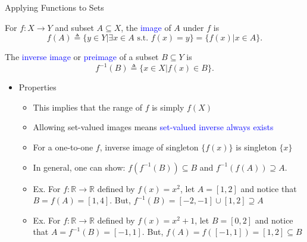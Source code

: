 \documentclass[10pt,english]{beamer}
\begin{document}
\begin{frame}{Applying Functions to Sets}

\vspace{3mm}
\begin{definition}
For $f \colon X\rightarrow Y$ and subset $A\subseteq X$, the \textcolor{blue}{image} of $A$ under $f$ is \vspace{-2mm}
\[ f(A) \triangleq \{ y\in Y | \exists x\in A \textrm{ s.t. } f(x)=y\} = \{f(x) | x\in A\}. \]
\end{definition}
\vspace{1mm}
\begin{definition}
The \textcolor{blue}{inverse image} or \textcolor{blue}{preimage} of a subset $B\subseteq Y$ is \vspace{-2mm}
\[ f^{-1}(B) \triangleq \{ x\in X | f(x)\in B\}. \]
\end{definition}
\vspace{-4.5mm}

\begin{itemize}
\setlength\itemsep{3mm}
\item<2-> Properties \vspace{1mm}
\begin{itemize}
  \setlength\itemsep{1.5mm}
  \item This implies that the range of $f$ is simply $f(X)$
  \item Allowing set-valued images means \textcolor{blue}{set-valued inverse always exists}
  \item For a one-to-one $f$, inverse image of singleton $\{ f(x) \}$ is singleton $\{ x \}$
  \item In general, one can show: $f(f^{-1}(B)) \subseteq B$ and $f^{-1}(f(A)) \supseteq A$.
  \item<3-> Ex. For $f \colon \mathbb{R} \rightarrow \mathbb{R}$ defined by $f(x)=x^2$, let $A=[1,2]$ and notice that $B = f(A) = [1,4]$.  But, $f^{-1}(B) = [-2,-1] \cup [1,2] \supseteq A$
  \item<4-> Ex. For $f \colon \mathbb{R} \rightarrow \mathbb{R}$ defined by $f(x)=x^2+1$, let $B=[0,2]$ and notice that $A = f^{-1}(B) = [-1,1]$.  But, $f(A) = f([-1,1]) = [1,2] \subseteq B$
\end{itemize}
\end{itemize}

\end{frame}  
  
\end{document}
